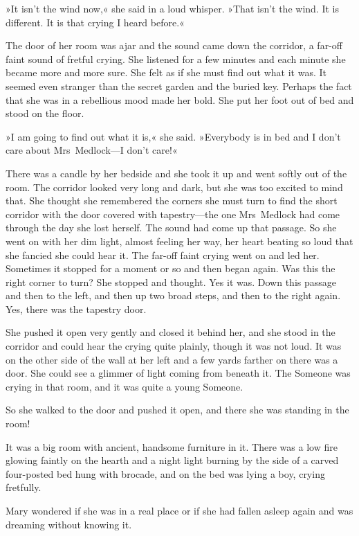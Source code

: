 »It isn't the wind now,« she said in a loud whisper. »That isn't the wind. It is different. It is that crying I heard before.«

The door of her room was ajar and the sound came down the corridor, a far-off faint sound of fretful crying. She listened for a few minutes and each minute she became more and more sure. She felt as if she must find out what it was. It seemed even stranger than the secret garden and the buried key. Perhaps the fact that she was in a rebellious mood made her bold. She put her foot out of bed and stood on the floor.

»I am going to find out what it is,« she said. »Everybody is in bed and I don't care about Mrs~Medlock—I don't care!«

There was a candle by her bedside and she took it up and went softly out of the room. The corridor looked very long and dark, but she was too excited to mind that. She thought she remembered the corners she must turn to find the short corridor with the door covered with tapestry—the one Mrs~Medlock had come through the day she lost herself. The sound had come up that passage. So she went on with her dim light, almost feeling her way, her heart beating so loud that she fancied she could hear it. The far-off faint crying went on and led her. Sometimes it stopped for a moment or so and then began again. Was this the right corner to turn? She stopped and thought. Yes it was. Down this passage and then to the left, and then up two broad steps, and then to the right again. Yes, there was the tapestry door.

She pushed it open very gently and closed it behind her, and she stood in the corridor and could hear the crying quite plainly, though it was not loud. It was on the other side of the wall at her left and a few yards farther on there was a door. She could see a glimmer of light coming from beneath it. The Someone was crying in that room, and it was quite a young Someone.

So she walked to the door and pushed it open, and there she was standing in the room!

It was a big room with ancient, handsome furniture in it. There was a low fire glowing faintly on the hearth and a night light burning by the side of a carved four-posted bed hung with brocade, and on the bed was lying a boy, crying fretfully.

Mary wondered if she was in a real place or if she had fallen asleep again and was dreaming without knowing it.

